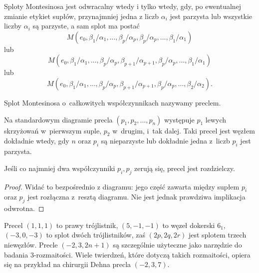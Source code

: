 \begin{proposition}
    Sploty Montesinosa jest odwracalny wtedy i tylko wtedy, gdy, po ewentualnej zmianie etykiet supłów, przynajmniej jedna z liczb $\alpha_i$ jest parzysta lub wszystkie liczby $\alpha_i$ są parzyste, a sam splot ma postać
    \begin{equation}
        M(e_0, \beta_1/\alpha_1, \ldots, \beta_p/\alpha_p, \beta_p/\alpha_p, \ldots, \beta_1/\alpha_1)
    \end{equation}
    lub
    \begin{equation}
        M(e_0, \beta_1/\alpha_1, \ldots, \beta_p/\alpha_p, \beta_{p+1}/\alpha_{p+1}, \beta_p/\alpha_p, \ldots, \beta_1/\alpha_1)
    \end{equation}
    lub
    \begin{equation}
         M(e_0, \beta_1/\alpha_1, \ldots, \beta_p/\alpha_p, \beta_{p+1}/\alpha_{p+1}, \beta_p/\alpha_p, \ldots, \beta_2/\alpha_2).
    \end{equation}
\end{proposition}

\begin{definition}
    \label{def:pretzel}
    Splot Montesinosa o~całkowitych współczynnikach nazywamy preclem.
\end{definition}

Na standardowym diagramie precla $(p_1, p_2, \ldots, p_n)$ występuje $p_1$ lewych skrzyżowań w~pierwszym suple, $p_2$ w~drugim, i~tak dalej.
Taki precel jest węzłem dokładnie wtedy, gdy $n$ oraz $p_i$ są nieparzyste lub dokładnie jedna z~liczb $p_i$ jest parzysta.

\begin{proposition}
    Jeśli co najmniej dwa współczynniki $p_i, p_j$ zerują się, precel jest rozdzielczy.
\end{proposition}

\begin{proof}
    Widać to bezpośrednio z diagramu: jego część zawarta między supłem $p_i$ oraz $p_j$ jest rozłączna z~resztą diagramu.
    Nie jest jednak prawdziwa implikacja odwrotna.
\end{proof}

Precel $(1,1,1)$ to prawy trójlistnik, $(5, -1, -1)$ to węzeł dokerski $6_1$, $(-3, 0, -3)$ to splot dwóch trójlistników, zaś $(2p, 2q, 2r)$ jest splotem trzech niewęzłów.
Precle $(-2, 3, 2n+1)$ są szczególnie użyteczne jako narzędzie do badania 3-rozmaitości.
Wiele twierdzeń, które dotyczą takich rozmaitości, opiera się na przykład na chirurgii Dehna precla $(-2, 3, 7)$.

